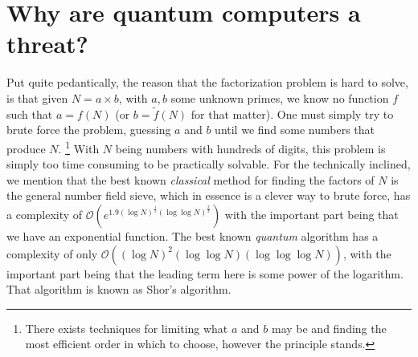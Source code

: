 \documentclass[conference]{IEEEtran}
\begin{document}
\section{Why are quantum computers a threat?}
Put quite pedantically, the reason that the factorization problem is hard to solve, is that given $N = a \times b$, with $a,b$ some unknown primes, we know no function $f$ such that $a = f(N)$ (or $b=\tilde{f}(N)$ for that matter).
One must simply try to brute force the problem, guessing $a$ and $b$ until we find some numbers that produce $N$. \footnote{There exists techniques for limiting what $a$ and $b$ may be and finding the most efficient order in which to choose, however the principle stands.}
With $N$ being numbers with hundreds of digits, this problem is simply too time consuming to be practically solvable.
For the technically inclined, we mention that the best known \emph{classical} method for finding the factors of $N$ is the general number field sieve, which in essence is a clever way to brute force, has a complexity of
$\mathcal{O}(e^{1.9 (\log N)^\frac13 (\log\log N)^\frac23})$ with the important part being that we have an exponential function.
The best known \emph{quantum} algorithm has a complexity of only $\mathcal{O}((\log N)^2 (\log \log N)(\log \log\log N))$, with the important part being that the leading term here is some power of the logarithm.
That algorithm is known as Shor's algorithm.
\end{document}

